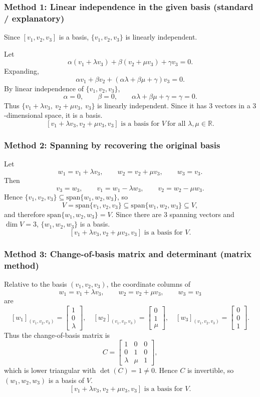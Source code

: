 \documentclass[12pt]{article}
\let\amsboxed\boxed
\renewcommand{\boxed}[1]{\amsboxed{\,#1\,}}
\begin{document}
\subsubsection{Method 1: Linear independence in the given basis (standard / explanatory)}
Since $[v_1,v_2,v_3]$ is a basis, $\{v_1,v_2,v_3\}$ is linearly independent.

Let
\[
\alpha (v_1+\lambda v_3)+\beta (v_2+\mu v_3)+\gamma v_3=0.
\]
Expanding,
\[
\alpha v_1+\beta v_2+(\alpha\lambda+\beta\mu+\gamma)v_3=0.
\]
By linear independence of $\{v_1,v_2,v_3\}$,
\[
\alpha=0,\qquad \beta=0,\qquad \alpha\lambda+\beta\mu+\gamma=\gamma=0.
\]
Thus $\{v_1+\lambda v_3,\ v_2+\mu v_3,\ v_3\}$ is linearly independent. Since it has $3$ vectors in a $3$-dimensional space, it is a basis.
\[
\boxed{\, [v_1 + \lambda v_3, v_2 + \mu v_3, v_3]\text{ is a basis for }V\ \text{for all }\lambda,\mu\in\mathbb{R}. \,}
\]
\bigskip
\subsubsection{Method 2: Spanning by recovering the original basis}
Let
\[
w_1=v_1+\lambda v_3,\qquad w_2=v_2+\mu v_3,\qquad w_3=v_3.
\]
Then
\[
v_3=w_3,\qquad v_1=w_1-\lambda w_3,\qquad v_2=w_2-\mu w_3.
\]
Hence $\{v_1,v_2,v_3\}\subseteq \mathrm{span}\{w_1,w_2,w_3\}$, so
\[
V=\mathrm{span}\{v_1,v_2,v_3\}\subseteq \mathrm{span}\{w_1,w_2,w_3\}\subseteq V,
\]
and therefore $\mathrm{span}\{w_1,w_2,w_3\}=V$. Since there are $3$ spanning vectors and $\dim V=3$, $\{w_1,w_2,w_3\}$ is a basis.
\[
\boxed{\, [v_1 + \lambda v_3, v_2 + \mu v_3, v_3]\text{ is a basis for }V. \,}
\]
\bigskip
\subsubsection{Method 3: Change-of-basis matrix and determinant (matrix method)}
Relative to the basis $(v_1,v_2,v_3)$, the coordinate columns of
\[
w_1=v_1+\lambda v_3,\qquad w_2=v_2+\mu v_3,\qquad w_3=v_3
\]
are
\[
[w_1]_{(v_1,v_2,v_3)}=\begin{bmatrix}1\\0\\\lambda\end{bmatrix},\quad
[w_2]_{(v_1,v_2,v_3)}=\begin{bmatrix}0\\1\\\mu\end{bmatrix},\quad
[w_3]_{(v_1,v_2,v_3)}=\begin{bmatrix}0\\0\\1\end{bmatrix}.
\]
Thus the change-of-basis matrix is
\[
C=
\begin{bmatrix}
1&0&0\\
0&1&0\\
\lambda&\mu&1
\end{bmatrix},
\]
which is lower triangular with $\det(C)=1\neq 0$. Hence $C$ is invertible, so $(w_1,w_2,w_3)$ is a basis of $V$.
\[
\boxed{\, [v_1 + \lambda v_3, v_2 + \mu v_3, v_3]\text{ is a basis for }V. \,}
\]
\bigskip
\end{document}
